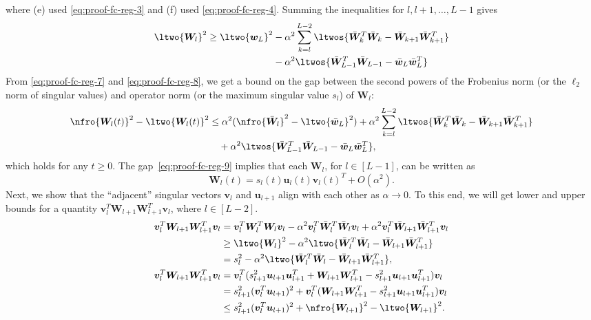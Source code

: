 \documentclass{article} %
\def\vu{{\bm{u}}}
\def\vv{{\bm{v}}}
\def\vw{{\bm{w}}}
\def\mW{{\bm{W}}}
\begin{document}
where (e) used \eqref{eq:proof-fc-reg-3} and (f) used \eqref{eq:proof-fc-reg-4}.
Summing the inequalities for $l, l+1, \dots, L-1$ gives
\begin{equation}
	\label{eq:proof-fc-reg-8}
	\begin{aligned}
		\ltwo{\mW_l}^2 \geq \ltwo{\vw_L}^2 
		&- \alpha^2 \sum_{k=l}^{L-2} \ltwos{\bar \mW_{k}^T \bar \mW_{k}- \bar \mW_{k+1} \bar \mW_{k+1}^T}\\
		&- \alpha^2 \ltwos{\bar \mW_{L-1}^T \bar \mW_{L-1}- \bar \vw_{L} \bar \vw_{L}^T}
	\end{aligned}
\end{equation}
From \eqref{eq:proof-fc-reg-7} and \eqref{eq:proof-fc-reg-8}, we get a bound on the gap between the second powers of the Frobenius norm (or the $\ell_2$ norm of singular values) and operator norm (or the maximum singular value $s_l$) of $\mW_l$:
\begin{align}
	\nfro{\mW_l(t)}^2 - \ltwo{\mW_l(t)}^2 
	&\leq 
	\alpha^2(\nfro{\bar \mW_l}^2 - \ltwo{\bar \vw_L}^2) 
	+ \alpha^2 \sum_{k=l}^{L-2} \ltwos{\bar \mW_{k}^T \bar \mW_{k}- \bar \mW_{k+1} \bar \mW_{k+1}^T}\notag\\
	&\quad+ \alpha^2 \ltwos{\bar \mW_{L-1}^T \bar \mW_{L-1}- \bar \vw_{L} \bar \vw_{L}^T},\label{eq:proof-fc-reg-9}
\end{align}
which holds for any $t \geq 0$.
The gap~\eqref{eq:proof-fc-reg-9} implies that each $\mW_l$, for $l \in [L-1]$, can be written as
\begin{equation}
\label{eq:proof-fc-reg-16}
    \mW_l(t) = s_l(t) \vu_l(t) \vv_l(t)^T + O(\alpha^2).
\end{equation}
Next, we show that the ``adjacent'' singular vectors $\vv_l$ and $\vu_{l+1}$ align with each other as $\alpha \to 0$. 
To this end, we will get lower and upper bounds for a quantity $\vv_l^T \mW_{l+1} \mW_{l+1}^T \vv_l$, where $l \in [L-2]$.
\begin{align}
    \vv_l^T \mW_{l+1} \mW_{l+1}^T \vv_l
    &= \vv_l^T \mW_l^T \mW_l \vv_l - \alpha^2 \vv_l^T \bar \mW_l^T \bar \mW_l \vv_l + \alpha^2 \vv_l^T \bar \mW_{l+1} \bar \mW_{l+1}^T \vv_l\notag\\
    &\geq \ltwo{\mW_l}^2 - \alpha^2 \ltwo{\bar \mW_l^T \bar \mW_l -  \bar \mW_{l+1} \bar \mW_{l+1}^T}\notag\\
    &= s_l^2 - \alpha^2 \ltwo{\bar \mW_l^T \bar \mW_l -  \bar \mW_{l+1} \bar \mW_{l+1}^T},\label{eq:proof-fc-reg-10}\\
    \vv_l^T \mW_{l+1} \mW_{l+1}^T \vv_l
    &= \vv_l^T (s_{l+1}^2 \vu_{l+1} \vu_{l+1}^T + \mW_{l+1} \mW_{l+1}^T - s_{l+1}^2 \vu_{l+1} \vu_{l+1}^T) \vv_l\notag\\
    &= s_{l+1}^2 (\vv_l^T \vu_{l+1})^2 + \vv_l^T (\mW_{l+1} \mW_{l+1}^T - s_{l+1}^2 \vu_{l+1} \vu_{l+1}^T) \vv_l\notag\\
    &\leq s_{l+1}^2 (\vv_l^T \vu_{l+1})^2 + \nfro{\mW_{l+1}}^2 - \ltwo{\mW_{l+1}}^2.\label{eq:proof-fc-reg-11}
\end{align}
\end{document}
